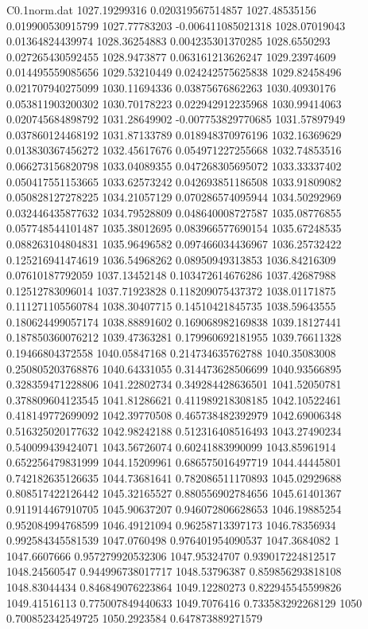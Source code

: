 \begin{filecontents}{C0.1norm.dat}
1027.19299316		0.020319567514857
1027.48535156		0.019900530915799
1027.77783203		-0.006411085021318
1028.07019043		0.01364824439974
1028.36254883		0.004235301370285
1028.6550293		0.027265430592455
1028.9473877		0.063161213626247
1029.23974609		0.014495559085656
1029.53210449		0.024242575625838
1029.82458496		0.021707940275099
1030.11694336		0.03875676862263
1030.40930176		0.053811903200302
1030.70178223		0.022942912235968
1030.99414063		0.020745684898792
1031.28649902		-0.007753829770685
1031.57897949		0.037860124468192
1031.87133789		0.018948370976196
1032.16369629		0.013830367456272
1032.45617676		0.054971227255668
1032.74853516		0.066273156820798
1033.04089355		0.047268305695072
1033.33337402		0.050417551153665
1033.62573242		0.042693851186508
1033.91809082		0.050828127278225
1034.21057129		0.070286574095944
1034.50292969		0.032446435877632
1034.79528809		0.048640008727587
1035.08776855		0.057748544101487
1035.38012695		0.083966577690154
1035.67248535		0.088263104804831
1035.96496582		0.097466034436967
1036.25732422		0.125216941474619
1036.54968262		0.08950949313853
1036.84216309		0.07610187792059
1037.13452148		0.103472614676286
1037.42687988		0.12512783096014
1037.71923828		0.118209075437372
1038.01171875		0.111271105560784
1038.30407715		0.14510421845735
1038.59643555		0.180624499057174
1038.88891602		0.169068982169838
1039.18127441		0.187850360076212
1039.47363281		0.179960692181955
1039.76611328		0.19466804372558
1040.05847168		0.214734635762788
1040.35083008		0.250805203768876
1040.64331055		0.314473628506699
1040.93566895		0.328359471228806
1041.22802734		0.349284428636501
1041.52050781		0.378809604123545
1041.81286621		0.411989218308185
1042.10522461		0.418149772699092
1042.39770508		0.465738482392979
1042.69006348		0.516325020177632
1042.98242188		0.512316408516493
1043.27490234		0.540099439424071
1043.56726074		0.60241883990099
1043.85961914		0.652256479831999
1044.15209961		0.686575016497719
1044.44445801		0.742182635126635
1044.73681641		0.782086511170893
1045.02929688		0.808517422126442
1045.32165527		0.880556902784656
1045.61401367		0.911914467910705
1045.90637207		0.946072806628653
1046.19885254		0.952084994768599
1046.49121094		0.96258713397173
1046.78356934		0.992584345581539
1047.0760498		0.976401954090537
1047.3684082		1
1047.6607666		0.957279920532306
1047.95324707		0.939017224812517
1048.24560547		0.944996738017717
1048.53796387		0.859856293818108
1048.83044434		0.846849076223864
1049.12280273		0.822945545599826
1049.41516113		0.775007849440633
1049.7076416		0.733583292268129
1050		0.700852342549725
1050.2923584		0.647873889271579

\end{filecontents}
